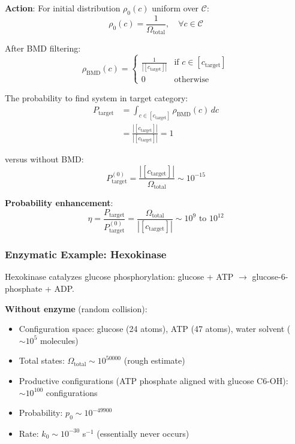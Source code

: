 \documentclass[11pt,a4paper]{article}
\begin{document}
\textbf{Action}: For initial distribution $\rho_0(c)$ uniform over $\mathcal{C}$:
\begin{equation}
\rho_0(c) = \frac{1}{\Omega_{\text{total}}}, \quad \forall c \in \mathcal{C}
\end{equation}

After BMD filtering:
\begin{equation}
\rho_{\text{BMD}}(c) = \begin{cases}
\frac{1}{|[c_{\text{target}}]|} & \text{if } c \in [c_{\text{target}}] \\
0 & \text{otherwise}
\end{cases}
\end{equation}

The probability to find system in target category:
\begin{align}
P_{\text{target}} &= \int_{c \in [c_{\text{target}}]} \rho_{\text{BMD}}(c) \, dc \\
&= \frac{|[c_{\text{target}}]|}{|[c_{\text{target}}]|} = 1
\end{align}

versus without BMD:
\begin{equation}
P_{\text{target}}^{(0)} = \frac{|[c_{\text{target}}]|}{\Omega_{\text{total}}} \sim 10^{-15}
\end{equation}

\textbf{Probability enhancement}:
\begin{equation}
\eta = \frac{P_{\text{target}}}{P_{\text{target}}^{(0)}} = \frac{\Omega_{\text{total}}}{|[c_{\text{target}}]|} \sim 10^{9} \text{ to } 10^{12}
\end{equation}

\subsubsection{Enzymatic Example: Hexokinase}

Hexokinase catalyzes glucose phosphorylation: glucose + ATP $\to$ glucose-6-phosphate + ADP.

\textbf{Without enzyme} (random collision):
\begin{itemize}
\item Configuration space: glucose (24 atoms), ATP (47 atoms), water solvent ($\sim 10^5$ molecules)
\item Total states: $\Omega_{\text{total}} \sim 10^{50000}$ (rough estimate)
\item Productive configurations (ATP phosphate aligned with glucose C6-OH): $\sim 10^{100}$ configurations
\item Probability: $p_0 \sim 10^{-49900}$
\item Rate: $k_0 \sim 10^{-30}$ s$^{-1}$ (essentially never occurs)
\end{itemize}
\end{document}
